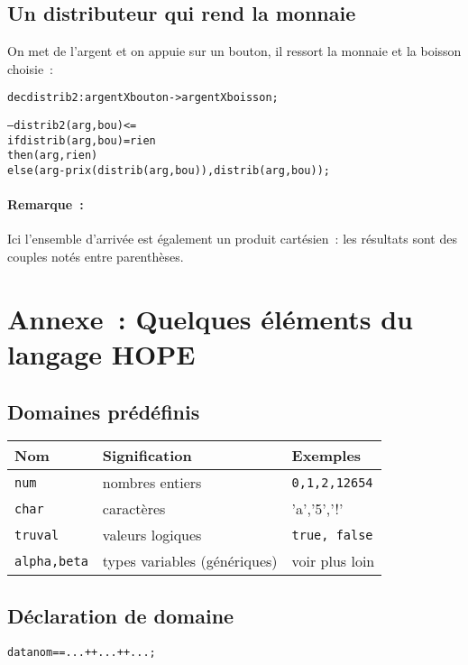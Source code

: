 \subsection{Un distributeur qui rend la monnaie}

On met de l'argent et on appuie sur un bouton, il ressort la monnaie
et la boisson choisie~:
\begin{alltt}
dec distrib2 : 	argent X bouton	-> argent X boisson ;

--- distrib2 (arg , bou ) <= 
        if distrib( arg , bou ) = rien
        then ( arg , rien )
        else ( arg - prix(distrib(arg,bou)) , distrib(arg,bou) );
\end{alltt}

\paragraph*{Remarque~:} Ici l'ensemble d'arrivée est également un produit cartésien~: les résultats sont des couples  notés entre parenthèses.



\section{Annexe~: Quelques éléments du langage HOPE}


\subsection*{Domaines prédéfinis}
\begin{center}
\begin{tabular}{lll}
\hline
Nom & Signification & Exemples\\
\hline
\texttt{num} & nombres entiers & \texttt{0,1,2,12654} \\ 
\texttt{char} & caractères
	&'a','5','!' \\ 
\texttt{truval} & valeurs logiques & \texttt{true, false} \\
	\texttt{alpha,beta} & types variables (génériques) &voir plus loin \\
\hline
\end{tabular}
\end{center}

\subsection*{Déclaration de domaine}

\begin{alltt}
data  nom	==  ... ++ ... ++ ... ;
\end{alltt}

